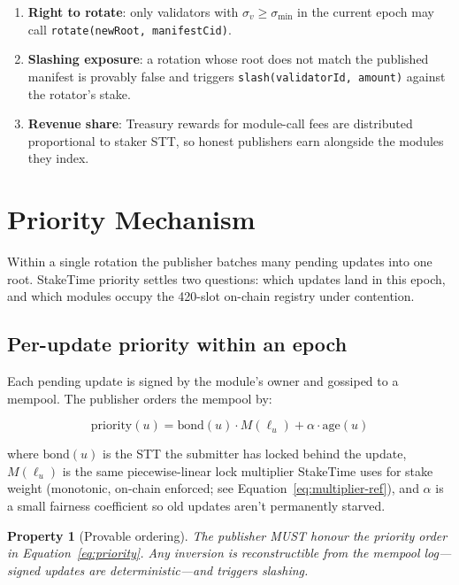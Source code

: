\documentclass[11pt,a4paper]{article}
\newtheorem{property}{Property}[section]
\begin{document}
\begin{enumerate}
    \item \textbf{Right to rotate}: only validators with $\sigma_v \geq \sigma_{\min}$ in the current epoch may call \texttt{rotate(newRoot, manifestCid)}.
    \item \textbf{Slashing exposure}: a rotation whose root does not match the published manifest is provably false and triggers \texttt{slash(validatorId, amount)} against the rotator's stake.
    \item \textbf{Revenue share}: Treasury rewards for module-call fees are distributed proportional to staker STT, so honest publishers earn alongside the modules they index.
\end{enumerate}

\section{Priority Mechanism}
\label{sec:priority}

Within a single rotation the publisher batches many pending updates into one root. StakeTime priority settles two questions: which updates land in this epoch, and which modules occupy the 420-slot on-chain registry under contention.

\subsection{Per-update priority within an epoch}

Each pending update is signed by the module's owner and gossiped to a mempool. The publisher orders the mempool by:

\begin{equation}
\mathrm{priority}(u) = \mathrm{bond}(u) \cdot M(\ell_u) + \alpha \cdot \mathrm{age}(u)
\label{eq:priority}
\end{equation}

where $\mathrm{bond}(u)$ is the STT the submitter has locked behind the update, $M(\ell_u)$ is the same piecewise-linear lock multiplier StakeTime uses for stake weight (monotonic, on-chain enforced; see Equation~\ref{eq:multiplier-ref}), and $\alpha$ is a small fairness coefficient so old updates aren't permanently starved.

\begin{property}[Provable ordering]
The publisher MUST honour the priority order in Equation~\ref{eq:priority}. Any inversion is reconstructible from the mempool log---signed updates are deterministic---and triggers slashing.
\end{property}
\end{document}
